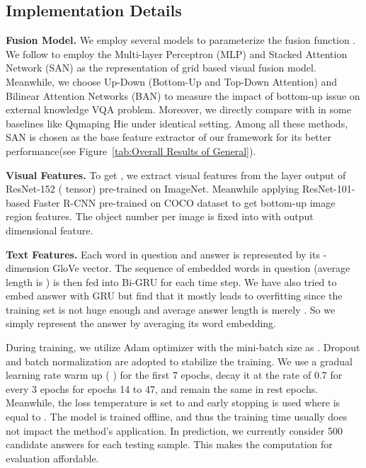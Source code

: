 \documentclass[runningheads]{llncs}
\begin{document}
\subsection{Implementation Details}\label{sec:Experimental Setup}
\textbf{Fusion Model.} We employ several models to parameterize the fusion function . 
We follow \cite{DBLP:conf/cvpr/HuCS18} to employ the Multi-layer Perceptron (MLP) and Stacked Attention Network (SAN) \cite{DBLP:conf/cvpr/YangHGDS16} as the representation of grid based visual fusion model. Meanwhile, we choose Up-Down (Bottom-Up and Top-Down Attention) \cite{DBLP:conf/cvpr/00010BT0GZ18} and Bilinear Attention Networks (BAN) \cite{DBLP:conf/nips/KimJZ18} to measure the impact of bottom-up issue on external knowledge VQA problem. Moreover, we directly compare with \cite{DBLP:journals/pami/WangWSDH18} in some baselines like Qqmaping \cite{DBLP:journals/pami/WangWSDH18}  Hie \cite{DBLP:conf/nips/LuYBP16} under identical setting. 
Among all these methods, SAN is chosen as the base feature extractor  of our framework for its better performance(see Figure~\ref{tab:Overall Results of General}).

\noindent\textbf{Visual Features.} 
To get , we extract visual features from the layer  output of ResNet-152 ( tensor) pre-trained on ImageNet.
Meanwhile applying ResNet-101-based Faster R-CNN pre-trained on COCO dataset to get bottom-up image region features. The object number per image is fixed into  with  output dimensional feature. 

\noindent\textbf{Text Features.} Each word in question and answer is represented by its -dimension GloVe \cite{DBLP:conf/emnlp/PenningtonSM14} vector.  The sequence of embedded words in question (average length is ) is then fed into Bi-GRU for each time step.
We have also tried to embed answer with GRU but find that it mostly leads to overfitting since the training set is not huge enough and average answer length is merely . So we simply represent the answer by averaging its word embedding.

During training, we utilize Adam optimizer with the mini-batch size as . Dropout and batch normalization are adopted to stabilize the training.
We use a gradual learning rate warm up ( ) for the first 7 epochs, decay it at the rate of 0.7 for every 3 epochs for epochs 14 to 47, and remain the same in rest epochs. Meanwhile, the  loss temperature  is set to  and early stopping is used where  is equal to  . 
The model is trained offline, and thus the training time usually does not impact the method’s application. In prediction, we currently consider 500 candidate answers for each testing sample. This makes the computation for evaluation affordable. 
\end{document}
